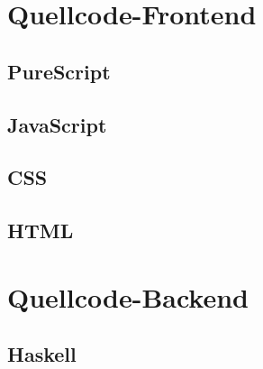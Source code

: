 \begin{appendices}
\section{Quellcode-Frontend}
\subsection{PureScript}







\subsection{JavaScript}



\subsection{CSS}

\subsection{HTML}

\section{Quellcode-Backend}
\subsection{Haskell}











\end{appendices}
